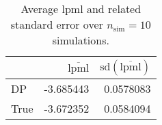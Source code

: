 \begin{table}[H]

\caption{Average lpml and related standard error over $n_{\text{sim}} = 10$ simulations.}
\centering
\begin{tabular}[t]{lrr}
\toprule
  & $\overbar{\text{lpml}}$ & $\text{sd}(\overbar{\text{lpml}})$\\
\midrule
DP & -3.685443 & 0.0578083\\
True & -3.672352 & 0.0584094\\
\bottomrule
\end{tabular}
\end{table}